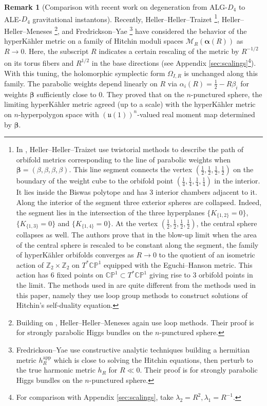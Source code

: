 \documentclass[12pt,letterpaper,reqno]{amsart}
\def\mathbf#1{#1}%
\theoremstyle{remark}
\theoremstyle{definition}
\newtheorem{rem}[thm]{Remark}
\numberwithin{thm}{section}
\numberwithin{equation}{section}
\numberwithin{figure}{section}
\newcommand{\CP}{\ensuremath{\mathbb {CP}}}
\newcommand{\Z}{\ensuremath{\mathbb Z}}
\begin{document}
  \begin{rem}[Comparison with recent work on degeneration from ALG-$D_4$ to ALE-$D_4$ gravitational instantons]   Recently, Heller--Heller--Traizet \cite{HHT2025}\footnote{   In \cite{HHT2025}, Heller--Heller--Traizet use twistorial methods to describe the path of orbifold metrics corresponding to the line of parabolic weights when $\boldsymbol{\beta}=(\beta, \beta, \beta, \beta)$. This line segment connects the vertex $(\frac 12, \frac 12,\frac 12,\frac 12)$ on the boundary of the weight cube to the orbifold point $(\frac 14, \frac 14, \frac 14, \frac 14)$ in the interior. It lies inside the Biswas polytope and has 3 interior chambers adjacent to it.  Along the interior of the segment three exterior spheres are collapsed. Indeed, the segment lies in the intersection of the three hyperplanes $\{K_{\{1,2\}}=0\}$, $\{K_{\{1,3\}}=0\}$ and $\{K_{\{1,4\}}=0\}$. At the vertex $(\frac 12, \frac 12,\frac 12,\frac 12)$, the central sphere collapses as well.  The authors prove that in the blow-up limit when the area of the central sphere is rescaled to be constant along the segment, the family of hyperK\"ahler orbifolds converges as $R \to 0$ to the quotient of an isometric action of $\Z_2 \times \Z_2$  on $T^*\CP^1$ equipped with the Eguchi--Hanson metric. This action has 6 fixed points on $\CP^1 \subset T^*\CP^1$ giving rise to 3 orbifold points in the limit. The methods used in \cite{HHT2025} are quite different from the methods used in this paper, namely they use loop group methods to construct solutions of Hitchin's self-duality equation.
}, Heller--Heller--Meneses \cite{HellerHellerMeneses}\footnote{Building on \cite{HHT2025}, Heller--Heller--Meneses again use loop methods. Their proof is for strongly parabolic Higgs bundles on the $n$-punctured sphere.}, and Fredrickson--Yae \cite{FredricksonYae}\footnote{Fredrickson--Yae use constructive analytic techniques building a hermitian metric $h_R^{\mathrm{app}}$ which is close to solving the Hitchin equations, then perturb to the true harmonic metric $h_R$ for $R\ll 0$. Their proof is for strongly parabolic Higgs bundles on the $n$-punctured sphere.} have considered the behavior of the  hyperK\"ahler metric  on a family of Hitchin moduli spaces $\mathcal{M}_R(\boldsymbol{\alpha}(R))$ as $R \to 0$. Here, the subscript $R$ indicates a certain rescaling of the metric by $R^{-1/2}$ on its torus fibers and $R^{1/2}$ in the base directions (see Appendix \ref{sec:scalings}\footnote{For comparison with Appendix \ref{sec:scalings}, take $\lambda_2=R^2, \lambda_1=R^{-1}$.}).  With this tuning, the holomorphic symplectic form $\Omega_{I, R}$ is unchanged along this family. The parabolic weights depend linearly on $R$ via $\alpha_i(R)=\frac{1}{2} - R \beta_i$ for weights $\boldsymbol{\beta}$ sufficiently close to $\mathbf{0}$. They proved that on the $n$-punctured sphere, the limiting hyperK\"ahler metric  agreed (up to a scale) with the hyperK\"ahler metric on $n$-hyperpolygon space with $(\mathfrak{u}(1))^n$-valued real moment map determined by $\boldsymbol{\beta}$.


\end{rem}
\end{document}
